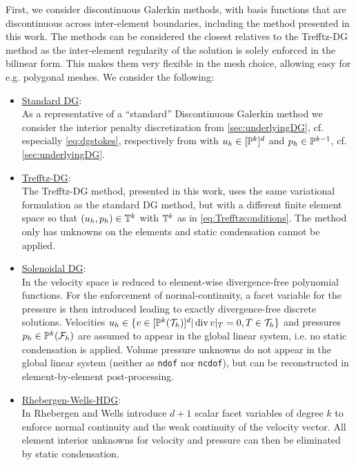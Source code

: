 \documentclass[pdflatex,sn-mathphys,Numbered]{sn-jnl}%
\theoremstyle{remark}%
\theoremstyle{definition}%
\begin{document}
First, we consider discontinuous Galerkin methods, with basis functions that are discontinuous across inter-element boundaries, including the method presented in this work.  
The methods can be considered the closest relatives to the Trefftz-DG method as the inter-element regularity of the solution is solely enforced in the bilinear form. 
This makes them very flexible in the mesh choice, allowing easy for e.g. polygonal meshes.
We consider the following:
%
\begin{itemize}
  \item \underline{Standard DG}: \\[0.4ex] As a representative of a ``standard'' Discontinuous Galerkin method we consider the interior penalty discretization from 
  \cref{sec:underlyingDG}, cf. especially \eqref{eq:dgstokes}, respectively from \cite[Section 6.1.5]{di2011mathematical} with $u_h \in [\mathbb{P}^k]^d$ and $p_h \in \mathbb{P}^{k-1}$, cf. \cref{sec:underlyingDG}.
  \item \underline{Trefftz-DG}: \\ The Trefftz-DG method, presented in this work, uses the same variational formulation as the standard DG method, but with a different finite element space so that $(u_h,p_h) \in \mathbb{T}^k$ with $\mathbb{T}^k$ as in \eqref{eq:Trefftzconditions}. %
  The method only has unknowns on the elements and static condensation cannot be applied.
  \item \underline{Solenoidal DG}: \\[0.4ex] In \cite{montlaur08,montlaur2010discontinuous} the velocity space is reduced to element-wise divergence-free polynomial functions. For the enforcement of normal-continuity, a facet variable for the pressure is then introduced leading to exactly divergence-free discrete solutions. Velocities $u_h \in \{ v \in [\mathbb{P}^k({\mathcal{T}_h})]^d | \operatorname{\mathrm{div}} v|_T = 0, T \in {\mathcal{T}_h} \} $ and pressures $p_h \in \mathbb{P}^k({\mathcal{F}_h})$ are assumed to appear in the global linear system, i.e. no static condensation is applied. Volume pressure unknowns do not appear in the global linear system (neither as \texttt{ndof} nor \texttt{ncdof}), but can be reconstructed in element-by-element post-processing.
  \item \underline{Rhebergen-Wells-HDG}: \\[0.4ex] In \cite{RhebergenWells} Rhebergen and Wells introduce $d+1$ scalar facet variables of degree $k$ to enforce normal continuity and the weak continuity of the velocity vector. All element interior unknowns for velocity and pressure can then be eliminated by static condensation.
\end{itemize}
\end{document}
